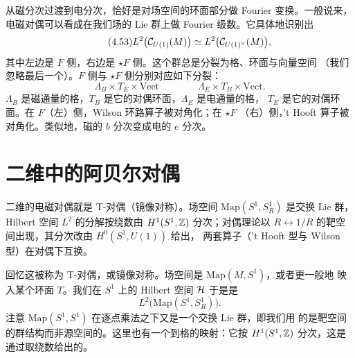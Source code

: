 从磁分次过渡到电分次，恰好是对场空间的环面部分做 Fourier 变换。一般说来，
电磁对偶可以看成在我们场的 Lie 群上做 Fourier 级数。它具体地识别出
\begin{equation}\tag{4.53}
L^{2}\bigl(\mathcal{C}_{U(1)}(M)\bigr)\simeq L^{2}\bigl(\mathcal{C}_{U(1)^{\vee}}(M)\bigr),
\end{equation}
其中左边是 $F$ 侧，右边是 $\star F$ 侧。这个群总是分裂为格、环面与向量空间
（我们忽略最后一个）。$F$ 侧与 $\star F$ 侧分别对应如下分裂：
\begin{equation}\tag{4.54}
\Lambda_{B}\times T_{E}\times\mathrm{Vect}
\qquad\qquad
\Lambda_{E}\times T_{B}\times\mathrm{Vect}.
\end{equation}
$\Lambda_{B}$ 是磁通量的格，$T_{B}$ 是它的对偶环面，$\Lambda_{E}$ 是电通量的格，
$T_{E}$ 是它的对偶环面。在 $F$（左）侧，Wilson 环路算子被对角化；在 $\star F$
（右）侧，'t Hooft 算子被对角化。类似地，磁的 $b$ 分次变成电的 $e$ 分次。


\section{二维中的阿贝尔对偶}
\begin{sectionkey}
二维的电磁对偶就是 T-对偶（镜像对称）。场空间
$\mathrm{Map}(S^{1},S^{1}_{R})$ 是交换 Lie 群，Hilbert 空间
$L^{2}$ 的分解按绕数由 $H^{1}(S^{1},\mathbb{Z})$ 分次；对偶理论以
$R\leftrightarrow1/R$ 的靶空间出现，其分次改由 $H^{0}(S^{1},U(1))$ 给出，
两套算子（'t Hooft 型与 Wilson 型）在对偶下互换。
\end{sectionkey}

回忆这被称为 T-对偶，或镜像对称。场空间是 $\mathrm{Map}(M,S^{1})$，或者更一般地
映入某个环面 $T$。我们在 $S^{1}$ 上的 Hilbert 空间 $\mathcal{H}$ 于是是
\begin{equation}\tag{4.55}
L^{2}\bigl(\mathrm{Map}(S^{1},S^{1}_{R})\bigr).
\end{equation}
注意 $\mathrm{Map}(S^{1},S^{1})$ 在逐点乘法之下又是一个交换 Lie 群，即我们用
的是靶空间的群结构而非源空间的。这里也有一个到格的映射：它按
$H^{1}(S^{1},\mathbb{Z})$ 分次，这是通过取绕数给出的。

